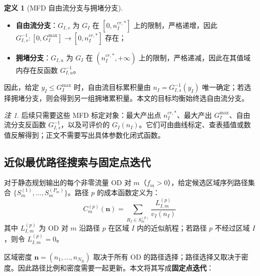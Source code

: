 \documentclass[a4paper,12pt]{article}
\theoremstyle{plain}
\theoremstyle{definition}
\newtheorem{definition}[theorem]{定义}
\theoremstyle{remark}
\newtheorem{remark}[theorem]{注}
\begin{document}
\begin{definition}[MFD 自由流分支与拥堵分支]\label{def:mfd_branches}
\begin{itemize}
    \item \textbf{自由流分支}：$G_{I,s}$ 为 $G_I$ 在 $[0,n_I^{cr,*}]$ 上的限制，严格递增，因此 $G_{I,s}^{-1}:[0,G_I^{\max}]\to[0,n_I^{cr,*}]$ 存在；
    \item \textbf{拥堵分支}：$G_{I,u}$ 为 $G_I$ 在 $(n_I^{cr,*},+\infty)$ 上的限制，严格递减，因此在其值域内存在反函数 $G_{I,u}^{-1}$。
\end{itemize}
因此，给定 $y_I\le G_I^{\max}$ 时，自由流目标累积量由 $n_I=G_{I,s}^{-1}(y_I)$ 唯一确定；若选择拥堵分支，则会得到另一组拥堵累积量。本文的目标均衡始终选自由流分支。
\end{definition}

\begin{remark}
后续只需要这些 MFD 标定对象：最大产出点 $n_I^{cr,*}$、最大产出 $G_I^{\max}$、自由流分支反函数 $G_{I,s}^{-1}$，以及可评价的 $G_I(n_I)$。它们可由曲线标定、查表插值或数值反解得到；正文不需要写出具体参数化闭式函数。
\end{remark}

\subsection{近似最优路径搜索与固定点迭代}

对于静态规划输出的每个非零流量 OD 对 $m$（$f_m > 0$），给定候选区域序列路径集合 $\{S_m^{(1)},\dots,S_m^{(P_m)}\}$。路径 $p$ 的成本函数定义为：
\begin{equation}\label{eq:path_cost}
    C_m^{(p)}(\bm n) = \sum_{R_I \in S_m^{(p)}} \frac{L_{I,m}^{(p)}}{v_I(n_I)}
\end{equation}
其中 $L_{I,m}^{(p)}$ 为 OD 对 $m$ 沿路径 $p$ 在区域 $I$ 内的近似航程；若路径 $p$ 不经过区域 $I$，则令 $L_{I,m}^{(p)}=0$。

区域密度 $\bm{n} = (n_1, \dots, n_{N_R})$ 取决于所有 OD 的路径选择；路径选择又取决于密度。因此路径比例和密度需要一起更新。本文将其写成\textbf{固定点迭代}：
\end{document}
